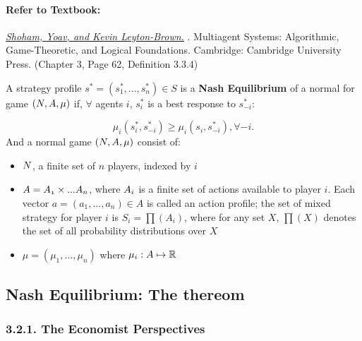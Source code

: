 \documentclass[runningheads]{llncs}
\begin{document}
\paragraph{Refer to Textbook:} 
\href{http://www.masfoundations.org/mas.pdf}{\textit{\underline{Shoham, Yoav, and Kevin Leyton-Brown.}}} \citeyear{shoham2008multiagent}. Multiagent Systems: Algorithmic, Game-Theoretic, and Logical Foundations. Cambridge: Cambridge University Press. (Chapter 3, Page 62, Definition 3.3.4)
\begin{definition} A strategy profile $s^{*}=(s_{1}^{*},...,s_{n}^{*})\in S$ is a \textbf{Nash Equilibrium} of a normal for game $(\mathnormal{N}, \mathnormal{A}, \mu)$ if, $\forall$ agents $i$, $s_{i}^{*}$ is a best response to $s_{-i}^{*}$:

$$\mu_{i}(s_{i}^{*},s_{-i}^{*}) \geq \mu_{i}(s_{i},s_{-i}^{*}), \forall -i.$$
And a normal game $(\mathnormal{N}, \mathnormal{A}, \mu)$ consist of:
\begin{itemize}
    \item $\mathnormal{N}$, a finite set of $n$ players, indexed by $i$
    \item $\mathnormal{A} =\mathnormal{A_{1}}\times ...\mathnormal{A_{n}}$, where $\mathnormal{A_{i}}$ is a finite set of actions available to player $i$. Each vector $a=(a_{1},...,a_{n})\in A$ is called an action profile; the set of mixed strategy for player $i$ is $S_{i}=\prod(A_{i})$, where for any set $X$, $\prod(X)$ denotes the set of all probability distributions over $X$
    \item $\mu = (\mu_{1},...,\mu_{n})$ where $\mu_{i}: \mathnormal{A} \mapsto \mathbb{R} $
\end{itemize}

\end{definition}

\subsection{Nash Equilibrium: The thereom}
\subsubsection{3.2.1. The Economist Perspectives}
\end{document}
